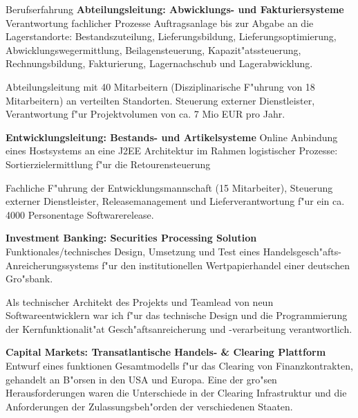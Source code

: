 \begin{rubric}{Berufserfahrung}
\entry*[08/2006 - 07/2009] \textbf{Abteilungsleitung: Abwicklungs- und Fakturiersysteme}\newline
{} 
Verantwortung fachlicher Prozesse Auftragsanlage bis zur Abgabe an die Lagerstandorte: Bestandszuteilung,
Lieferungsbildung, Lieferungsoptimierung, Abwicklungswegermittlung, Beilagensteuerung, Kapazit"atssteuerung, Rechnungsbildung, Fakturierung, Lagernachschub und Lagerabwicklung.\axelvspace

Abteilungsleitung mit 40 Mitarbeitern (Disziplinarische F"uhrung von 18 Mitarbeitern) an verteilten Standorten. Steuerung externer Dienstleister, Verantwortung f"ur Projektvolumen von ca. 7 Mio EUR pro Jahr.

\entry*[01/2005 - 07/2006] \textbf{Entwicklungsleitung: Bestands- und Artikelsysteme}\newline
{} 
Online Anbindung eines Hostsystems an eine J2EE Architektur im Rahmen logistischer Prozesse: Sortierzielermittlung f"ur die Retourensteuerung\axelvspace

Fachliche F"uhrung der Entwicklungsmannschaft (15 Mitarbeiter), Steuerung externer Dienstleister, Releasemanagement und Lieferverantwortung f"ur ein ca. 4000 Personentage Softwarerelease.

\entry*[10/2003 - 12/2004] \textbf{Investment Banking: Securities Processing Solution}\newline
{} 
Funktionales/technisches Design, Umsetzung und Test eines Handelsgesch"afts-Anreicherungssystems f"ur den institutionellen Wertpapierhandel einer deutschen Gro"sbank.\axelvspace

Als technischer Architekt des Projekts und Teamlead von neun Softwareentwicklern war ich f"ur das technische Design und die Programmierung der Kernfunktionalit"at Gesch"aftsanreicherung und -verarbeitung verantwortlich. 

\entry*[07/2003 - 10/2003] \textbf{Capital Markets: Transatlantische Handels- \& Clearing Plattform}\newline
{} 
Entwurf eines funktionen Gesamtmodells f"ur das Clearing von Finanzkontrakten, gehandelt an B"orsen in den USA und Europa. Eine der gro"sen Herausforderungen waren die Unterschiede in der Clearing Infrastruktur und die Anforderungen der Zulassungsbeh"orden der verschiedenen Staaten.\axelvspace


\end{rubric}
